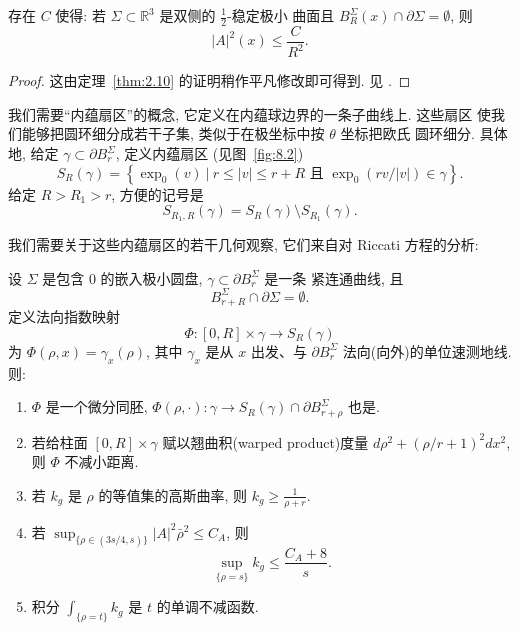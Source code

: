 \begin{lemma}
\label{lem:8.5}
存在 $C$ 使得: 若 $\Sigma\subset\mathbb R^3$ 是双侧的 $\frac12$-稳定极小
曲面且 $B_R^\Sigma(x)\cap\partial\Sigma=\emptyset$, 则
\[
|A|^2(x)\leq\frac{C}{R^2}.
\]
\end{lemma}

\begin{proof}
这由定理~\ref{thm:2.10} 的证明稍作平凡修改即可得到. 见 \cite{CM2}.
\end{proof}

我们需要``内蕴扇区''的概念, 它定义在内蕴球边界的一条子曲线上. 这些扇区
使我们能够把圆环细分成若干子集, 类似于在极坐标中按 $\theta$ 坐标把欧氏
圆环细分. 具体地, 给定 $\gamma\subset\partial B_r^\Sigma$, 定义内蕴扇区
(见图~\ref{fig:8.2})
\begin{equation}
S_R(\gamma)=\left\{\exp_0(v)\ \big|\ r\leq|v|\leq r+R
\text{ 且 }\exp_0(rv/|v|)\in\gamma\right\}.
\label{eq:8.9}
\end{equation}
给定 $R>R_1>r$, 方便的记号是
\begin{equation}
S_{R_1,R}(\gamma)=S_R(\gamma)\setminus S_{R_1}(\gamma).
\label{eq:8.10}
\end{equation}

我们需要关于这些内蕴扇区的若干几何观察, 它们来自对 Riccati 方程的分析:


\begin{lemma}
\label{lem:8.6}
设 $\Sigma$ 是包含 $0$ 的嵌入极小圆盘, $\gamma\subset\partial B_r^\Sigma$ 是一条
紧连通曲线, 且
\[
B_{r+R}^\Sigma\cap\partial\Sigma=\emptyset.
\]
定义法向指数映射
\[
\Phi:[0,R]\times\gamma\to S_R(\gamma)
\]
为 $\Phi(\rho,x)=\gamma_x(\rho)$, 其中 $\gamma_x$ 是从 $x$ 出发、与
$\partial B_r^\Sigma$ 法向(向外)的单位速测地线. 则:

\begin{enumerate}
\item[(1)] $\Phi$ 是一个微分同胚, $\Phi(\rho,\cdot):\gamma\to
S_R(\gamma)\cap\partial B_{r+\rho}^\Sigma$ 也是.

\item[(2)] 若给柱面 $[0,R]\times\gamma$ 赋以翘曲积(warped product)度量
$d\rho^2+(\rho/r+1)^2dx^2$, 则 $\Phi$ 不减小距离.

\item[(3)] 若 $k_g$ 是 $\rho$ 的等值集的高斯曲率, 则 $k_g\geq\frac{1}{\rho+r}$.

\item[(4)] 若 $\sup_{\{\rho\in(3s/4,s)\}}|A|^2\bar\rho^2\leq C_A$, 则
\[
\sup_{\{\rho=s\}}k_g\leq\frac{C_A+8}{s}.
\]

\item[(5)] 积分 $\int_{\{\rho=t\}}k_g$ 是 $t$ 的单调不减函数.
\end{enumerate}
\end{lemma}

